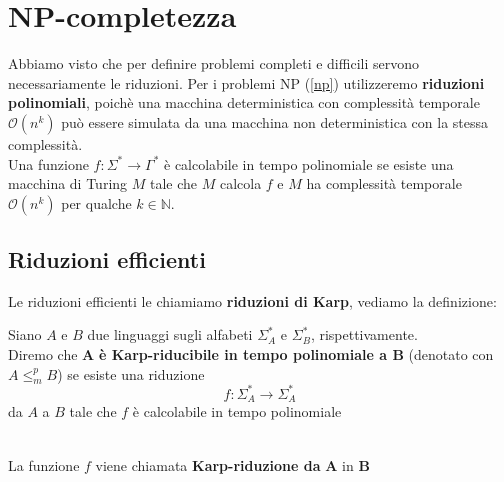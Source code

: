 
\section{NP-completezza}
Abbiamo visto che per definire problemi completi e difficili servono necessariamente le riduzioni. Per i problemi NP (\ref{np}) utilizzeremo \textbf{riduzioni polinomiali},
poichè una macchina deterministica con complessità temporale $\mathcal{O}(n^k)$ può essere simulata da una macchina non deterministica con la stessa complessità.\\
Una funzione $f: \Sigma^* \to \Gamma^*$ è calcolabile in tempo polinomiale se esiste una macchina di Turing $M$ tale che $M$ calcola $f$ e $M$ ha complessità temporale $\mathcal{O}(n^k)$
per qualche $k \in \mathbb{N}$.


\subsection{Riduzioni efficienti}
Le riduzioni efficienti le chiamiamo \textbf{riduzioni di Karp}, vediamo la definizione:\smallskip\\
\colorbox{SALZO}{\parbox{\dimexpr\linewidth-2\fboxsep}{\begin{definition}
    Siano $A$ e $B$ due linguaggi sugli alfabeti $\Sigma_A^*$ e $\Sigma_B^*$, rispettivamente. \\Diremo che 
    $\bm{A}$ \textbf{è Karp-riducibile in tempo polinomiale a B} (denotato con $A \le_{m}^{p}B$) se esiste una
    riduzione 
    \[f:\Sigma_A^* \to \Sigma_A^*\]
    da $A$ a $B$ tale che $f$ è calcolabile in tempo polinomiale  
\end{definition}}}\smallskip\\
La funzione $f$ viene chiamata \textbf{Karp-riduzione da} $\bm{A}$ in $\bm{B}$

\newpage
